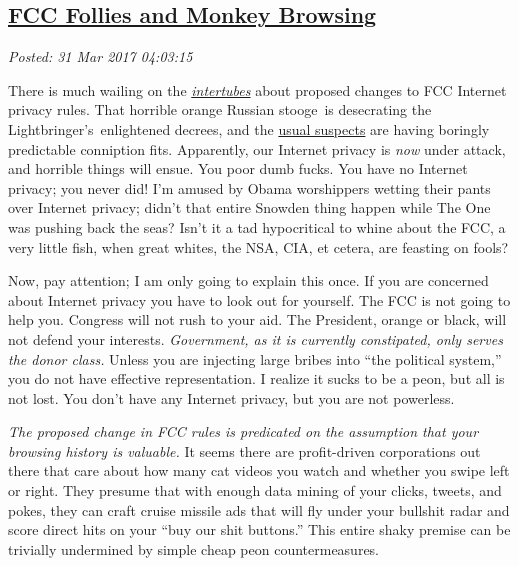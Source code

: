 %

\subsection*{\href{https://analyzethedatanotthedrivel.org/2017/03/30/fcc-follies-and-monkey-browsing/}{FCC Follies and Monkey Browsing}}


\noindent\emph{Posted: 31 Mar 2017 04:03:15}
\vspace{6pt}

There is much wailing on the
\href{http://www.urbandictionary.com/define.php?term=intertubes}{\emph{intertubes}} about
proposed changes to FCC Internet privacy rules. That horrible orange
Russian stooge~is desecrating the Lightbringer's~enlightened decrees, and
the
\href{https://www.washingtonpost.com/news/the-switch/wp/2017/03/28/republicans-are-poised-to-roll-back-landmark-fcc-privacy-rules-heres-what-you-need-to-know/}{usual
suspects} are having boringly predictable conniption fits. Apparently,
our Internet privacy is \emph{now} under attack, and horrible things will
ensue. You poor dumb fucks. You have no Internet privacy; you never did!
I'm amused by Obama worshippers wetting their pants over Internet
privacy; didn't that entire Snowden thing happen while The One was
pushing back the seas? Isn't it a tad hypocritical to whine about the
FCC, a very little fish, when great whites, the NSA, CIA, et cetera, are
feasting on fools?

Now, pay attention; I am only going to explain this once. If you are
concerned about Internet privacy you have to look out for yourself. The
FCC is not going to help you. Congress will not rush to your aid. The
President, orange or black, will not defend your interests.
\emph{Government, as it is currently constipated, only serves the donor
class.} Unless you are injecting large bribes into ``the political
system,'' you do not have effective representation. I realize it sucks to
be a peon, but all is not lost. You don't have any Internet privacy, but
you are not powerless.

\emph{The proposed change in FCC rules is predicated on the assumption
that your browsing history is valuable.} It seems there are profit-driven corporations 
out there that care about how many cat videos you
watch and whether you swipe left or right. They presume that with enough
data mining of your clicks, tweets, and pokes, they can craft cruise
missile ads that will fly under your bullshit radar and score direct
hits on your ``buy our shit buttons.'' This entire shaky premise can be
trivially undermined by simple cheap peon countermeasures.

